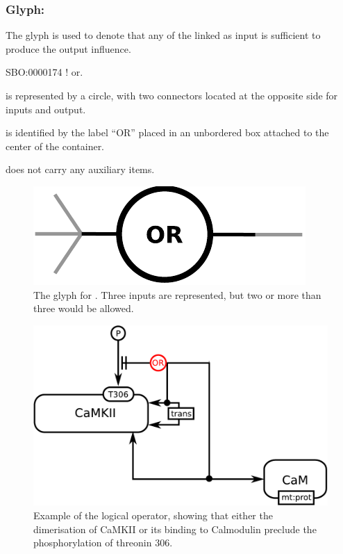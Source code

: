 \subsubsection{Glyph: }\label{sec:or}

The glyph  is used to denote that any of the  linked as input is sufficient to produce the output influence.

\begin{glyphDescription}

 \glyphSboTerm SBO:0000174 ! or.

 \glyphContainer {} is represented by a circle, with two connectors located at the opposite side for inputs and output.

  \glyphLabel {} is identified by the label ``OR'' placed in an unbordered box attached to the center of the container. 

  \glyphAux {} does not carry any auxiliary items.

\end{glyphDescription}

\begin{figure}[H]
  \centering
  \includegraphics[scale = 0.5]{images/or}
  \caption{The \ER glyph for . Three inputs are represented, but two or more than three would be allowed.}
  \label{fig:or}
\end{figure}


\begin{figure}[H]
  \centering
  \includegraphics[scale = 0.5]{examples/ex-or}
  \caption{Example of the  logical operator, showing that either the dimerisation of CaMKII or its binding to Calmodulin preclude the phosphorylation of threonin 306.}
  \label{fig:ex-or}
\end{figure}